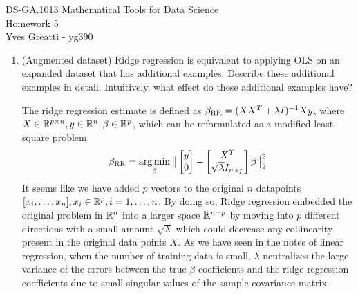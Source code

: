 \documentclass[12pt,twoside]{article}
\begin{document}
\noindent DS-GA.1013 Mathematical Tools for Data Science \\
Homework 5\\
Yves Greatti - yg390\\

\begin{enumerate}

\item (Augmented dataset) Ridge regression is equivalent to applying OLS on an expanded dataset that has additional examples. Describe these additional examples in detail. Intuitively, what effect do these additional examples have?\\
\medskip

The ridge regression estimate is defined as $\beta_{\operatorname{RR}} = (X X^T + \lambda I)^{-1} X y$, where $X \in \mathbb{R}^{p \times n}, y \in \mathbb{R}^n, \beta \in \mathbb{R}^p$, which can be reformulated as a modified least-square problem
$$\beta_{\operatorname{RR}} = \operatorname*{arg\,min}_\beta \big\| \begin{bmatrix} y   \\ 0 \end{bmatrix} - \begin{bmatrix} X^T   \\ \sqrt{\lambda} I_{n \times p} \end{bmatrix} \beta \big\|_2^2$$
It seems like we have added $p$ vectors to the original $n$ datapoints $[x_i, \ldots, x_n], x_i \in \mathbb{R}^p, i=1, \ldots, n$. By doing so, Ridge regression embedded the original problem in $\mathbb{R}^n$ into a larger space $\mathbb{R}^{n+p}$ by moving into $p$ different 
directions with a small amount $\sqrt{\lambda}$ which could decrease any collinearity present in the original data points $X$. As we have seen in the notes of linear regression, when the number of training data is small, $\lambda$ neutralizes the large variance of the errors between the true  $\beta$ coefficients and the ridge regression coefficients due to small singular values  of the sample covariance matrix.


\end{enumerate}
\end{document}
